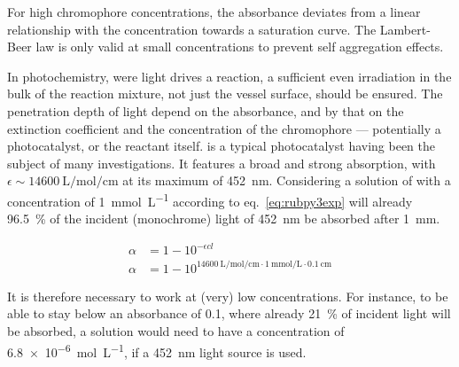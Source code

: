 			For high chromophore concentrations, the absorbance deviates from a linear relationship with the concentration towards a saturation curve. The Lambert-Beer law is only valid at small concentrations to prevent self aggregation effects. 

			In photochemistry, were light drives a reaction, a sufficient even irradiation in the bulk of the reaction mixture, not just the vessel surface, should be ensured. The penetration depth of light depend on the absorbance, and by that on the extinction coefficient and the concentration of the chromophore --- potentially a photocatalyst, or the reactant itself.  is a typical photocatalyst having been the subject of many investigations. It features a broad and strong absorption, with $\epsilon\sim \qty{14600}{\L\per\mol\per\cm}$ at its maximum of \qty{452}{\nm}. Considering a solution of  with a concentration of \qty{1}{\milli\mol\per\L} according to eq.~\ref{eq:rubpy3exp} will already \qty{96.5}{\percent} of the incident (monochrome) light of \qty{452}{\nm} be absorbed after \qty{1}{\mm}. 

			\begin{equation}
			\label{eq:rubpy3exp}
			\begin{split}
				\alpha &= 1 - 10^{-\epsilon c l} \\
				\alpha &= 1 - 10^{\qty{14600}{\L\per\mol\per\cm} \cdot \qty{1}{\milli\mol\per\L \cdot \qty{0.1}{\cm} }}
			\end{split}
			\end{equation} 

			It is therefore necessary to work at (very) low concentrations. For instance, to be able to stay below an absorbance of 0.1, where already \qty{21}{\percent} of incident light will be absorbed, a  solution would need to have a concentration of \qty{6.8e-6}{\mol\per\L}, if a \qty{452}{\nm} light source is used.


